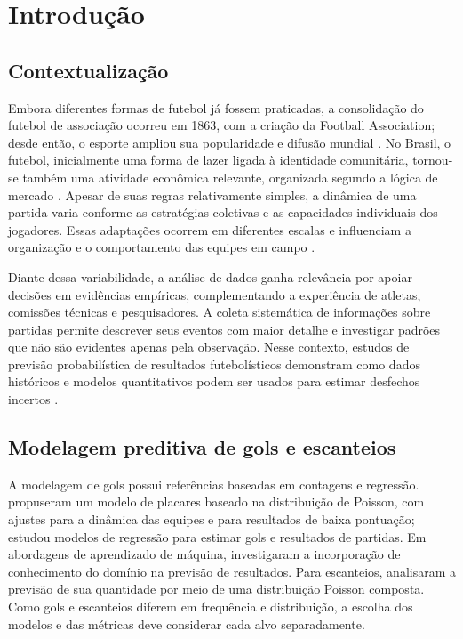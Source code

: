 \section{Introdução}\label{sec:Intro}

\subsection{Contextualização}

Embora diferentes formas de futebol já fossem praticadas, a consolidação do futebol de associação ocorreu em 1863, com a criação da Football Association; desde então, o esporte ampliou sua popularidade e difusão mundial \cite{freeman2023}. No Brasil, o futebol, inicialmente uma forma de lazer ligada à identidade comunitária, tornou-se também uma atividade econômica relevante, organizada segundo a lógica de mercado \cite{goncalvesCarvalho2006}. Apesar de suas regras relativamente simples, a dinâmica de uma partida varia conforme as estratégias coletivas e as capacidades individuais dos jogadores. Essas adaptações ocorrem em diferentes escalas e influenciam a organização e o comportamento das equipes em campo \cite{clavijo2022}.

Diante dessa variabilidade, a análise de dados ganha relevância por apoiar decisões em evidências empíricas, complementando a experiência de atletas, comissões técnicas e pesquisadores. A coleta sistemática de informações sobre partidas permite descrever seus eventos com maior detalhe e investigar padrões que não são evidentes apenas pela observação. Nesse contexto, estudos de previsão probabilística de resultados futebolísticos demonstram como dados históricos e modelos quantitativos podem ser usados para estimar desfechos incertos \cite{louzada2016}.

\subsection{Modelagem preditiva de gols e escanteios}

A modelagem de gols possui referências baseadas em contagens e regressão.  propuseram um modelo de placares baseado na distribuição de Poisson, com ajustes para a dinâmica das equipes e para resultados de baixa pontuação;  estudou modelos de regressão para estimar gols e resultados de partidas. Em abordagens de aprendizado de máquina,  investigaram a incorporação de conhecimento do domínio na previsão de resultados. Para escanteios,  analisaram a previsão de sua quantidade por meio de uma distribuição Poisson composta. Como gols e escanteios diferem em frequência e distribuição, a escolha dos modelos e das métricas deve considerar cada alvo separadamente.

